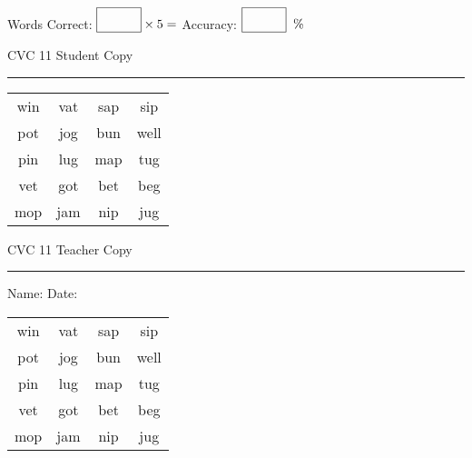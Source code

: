 \documentclass{memoir}
\begin{document}
\normalsize

Words Correct: $\fbox{\phantom{\huge 100}} \times 5 = $ Accuracy: $\fbox{\phantom{\huge 100}}\;\; \%$ 

\vfill

\newpage


\footnotesize \noindent
CVC 11 \hfill Student Copy
\smallskip
\hrule

\huge

\setlength{\tabcolsep}{14pt}
\def\arraystretch{2}

{\selectfont


\begin{vplace}[0.5]
\begin{center}
\begin{tabular}{cccc}
win & vat & sap & sip \\
pot & jog & bun & well \\
pin & lug & map & tug \\
vet & got & bet & beg \\
mop & jam & nip & jug \\
\end{tabular}
\end{center}
\end{vplace}

}

\newpage

\footnotesize \noindent
CVC 11 \hfill Teacher Copy
\smallskip
\hrule

\normalsize

\vfill

\noindent
Name: \underline{\hspace{1.75in}} \hfill Date: \underline{\hspace{1in}}

\huge

{\selectfont


\begin{vplace}[0.5]
\begin{center}
\begin{tabular}{cccc}
win & vat & sap & sip \\
pot & jog & bun & well \\
pin & lug & map & tug \\
vet & got & bet & beg \\
mop & jam & nip & jug \\
\end{tabular}
\end{center}
\end{vplace}



}
\end{document}
